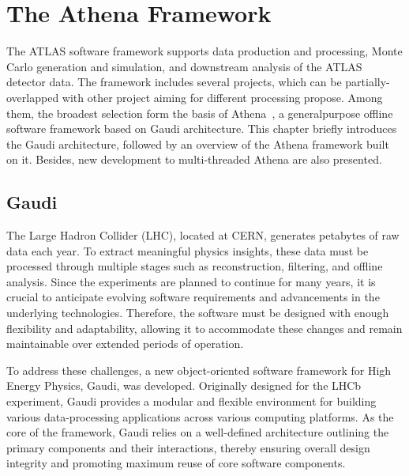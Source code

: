 \chapter{The Athena Framework} \label{ch:Athena}
The ATLAS software framework supports data production and processing, Monte Carlo generation and simulation, and downstream analysis of the ATLAS detector data. The framework includes several projects, which can be partially-overlapped with other project aiming for different processing propose. Among them, the broadest selection form the basis of Athena~\cite{ATLAScomputing2025}, a generalpurpose offline software framework based on Gaudi architecture. This chapter briefly introduces the Gaudi architecture, followed by an overview of the Athena framework built on it. Besides, new development to multi-threaded Athena are also presented.
\section{Gaudi} \label{sec:Gaudi}
The Large Hadron Collider (LHC), located at CERN, generates petabytes of raw data each year. To extract meaningful physics insights, these data must be processed through multiple stages such as reconstruction, filtering, and offline analysis. Since the experiments are planned to continue for many years, it is crucial to anticipate evolving software requirements and advancements in the underlying technologies. Therefore, the software must be designed with enough flexibility and adaptability, allowing it to accommodate these changes and remain maintainable over extended periods of operation.

To address these challenges, a new object-oriented software framework for High Energy Physics, Gaudi, was developed. Originally designed for the LHCb experiment, Gaudi provides a modular and flexible environment for building various data-processing applications across various computing platforms. As the core of the framework, Gaudi relies on a well-defined architecture outlining the primary components and their interactions, thereby ensuring overall design integrity and promoting maximum reuse of core software components. 

